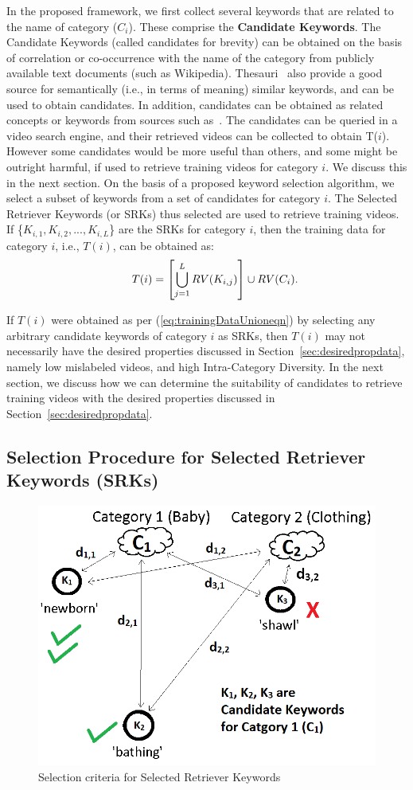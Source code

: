 In the proposed framework, we first collect several keywords that are related to the name of category ($C_i$). These comprise the \textbf{Candidate Keywords}. The Candidate Keywords (called candidates for brevity) can be obtained on the basis of correlation or co-occurrence with the name of the category from publicly available text documents (such as Wikipedia). Thesauri~\cite{nakayama2007wikipedia} also provide a good source for semantically (i.e., in terms of meaning) similar keywords, and can be used to obtain candidates. In addition, candidates can be obtained as related concepts or keywords from sources such as~\cite{ReverseDictionary}. The candidates can be queried in a video search engine, and their retrieved videos can be collected to obtain T($i$). However some candidates would be more useful than others, and some might be outright harmful, if used to retrieve training videos for category $i$. We discuss this in the next section. On the basis of a proposed keyword selection algorithm, we select a subset of keywords from a set of candidates for category $i$. The Selected Retriever Keywords (or SRKs) thus selected are used to retrieve training videos. If \{$K_{i,1}, K_{i,2}, ... , K_{i,L}$\}  are the SRKs for category $i$, then the training data for category $i$, i.e., $T(i)$, can be obtained as:
\begin{equation} \label{eq:trainingDataUnioneqn}
\indent T(i) = \left [ \bigcup_{j=1}^{L}RV(K_{i,j}) \right ]\cup RV(C_{i}). 
\end{equation}

If $T(i)$ were obtained as per (\ref{eq:trainingDataUnioneqn}) by selecting any arbitrary candidate keywords of category $i$ as SRKs, then $T(i)$ may not necessarily have the desired properties discussed in Section~\ref{sec:desiredpropdata}, namely low mislabeled videos, and high Intra-Category Diversity. In the next section, we discuss how we can determine the suitability of candidates to retrieve training videos with the desired properties discussed in Section~\ref{sec:desiredpropdata}.  

\subsection{Selection Procedure for Selected Retriever Keywords (SRKs)}
\begin{figure}
\centering
\includegraphics[width=0.6\linewidth]{TrainingData/WIfigures/keyword_properties_Baby2.png}
\caption{Selection criteria for Selected Retriever Keywords}
\label{fig:KeywordProperties}
\end{figure}

